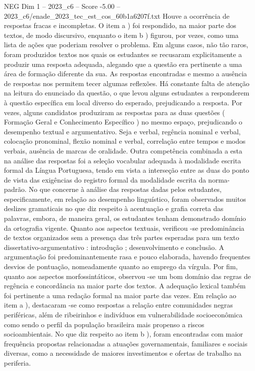 \begin{textsample}{NEG Dim 1 – 2023\_c6 – Score -5.00 – 2023\_c6/enade\_2023\_tec\_est\_cos\_60b1a6207f.txt}
Houve a ocorrência de respostas fracas e incompletas.
O item a ) foi respondido, na maior parte dos textos, de modo discursivo, enquanto o item b ) figurou, por vezes, como uma lista de ações que poderiam resolver o problema.
Em alguns casos, não tão raros, foram produzidos textos nos quais os estudantes se recusaram explicitamente a produzir uma resposta adequada, alegando que a questão era pertinente a uma área de formação diferente da sua.
As respostas encontradas e mesmo a ausência de respostas nos permitem tecer algumas reflexões.
Há constante falta de atenção na leitura do enunciado da questão, o que levou alguns estudantes a responderem à questão específica em local diverso do esperado, prejudicando a resposta.
Por vezes, alguns candidatos produziram as respostas para as duas questões ( Formação Geral e Conhecimento Específico ) no mesmo espaço, prejudicando o desempenho textual e argumentativo.
Seja e verbal, regência nominal e verbal, colocação pronominal, flexão nominal e verbal, correlação entre tempos e modos verbais, ausência de marcas de oralidade.
Outra competência combinada a esta na análise das respostas foi a seleção vocabular adequada à modalidade escrita formal da Língua Portuguesa, tendo em vista a interseção entre as duas do ponto de vista das exigências do registro formal da modalidade escrita da norma-padrão.
No que concerne à análise das respostas dadas pelos estudantes, especificamente, em relação ao desempenho linguístico, foram observados muitos deslizes gramaticais no que diz respeito à acentuação e grafia correta das palavras, embora, de maneira geral, os estudantes tenham demonstrado domínio da ortografia vigente.
Quanto aos aspectos textuais, verificou -se predominância de textos organizados sem a presença das três partes esperadas para um texto dissertativo-argumentativo : introdução ; desenvolvimento e conclusão.
A argumentação foi predominantemente rasa e pouco elaborada, havendo frequentes desvios de pontuação, nomeadamente quanto ao emprego da vírgula.
Por fim, quanto aos aspectos morfossintáticos, observou -se um bom domínio das regras de regência e concordância na maior parte dos textos.
A adequação lexical também foi pertinente a uma redação formal na maior parte das vezes.
Em relação ao item a ), destacaram -se como respostas a relação entre comunidades negras periféricas, além de ribeirinhos e indivíduos em vulnerabilidade socioeconômica como sendo o perfil da população brasileira mais propenso a riscos socioambientais.
No que diz respeito ao item b ), foram encontradas com maior frequência propostas relacionadas a atuações governamentais, familiares e sociais diversas, como a necessidade de maiores investimentos e ofertas de trabalho na periferia.

\end{textsample}
